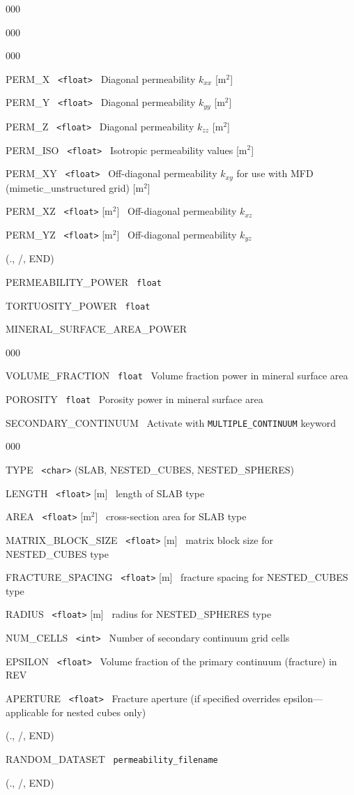 \documentclass[12pt]{article}
\begin{document}
\begin{deflist}{000}
\begin{deflist}{000}
\begin{deflist}{000}
\item[PERM\_X] \ {\tt <float>} \ Diagonal permeability $k_{xx}$ [m$^2$]
\item[PERM\_Y] \ {\tt <float>} \ Diagonal permeability $k_{yy}$ [m$^2$]
\item[PERM\_Z] \ {\tt <float>} \ Diagonal permeability $k_{zz}$ [m$^2$]
\item[PERM\_ISO] \ {\tt <float>} \ Isotropic permeability values [m$^2$]
\item[PERM\_XY] \ {\tt <float>} \ Off-diagonal permeability $k_{xy}$ for use with MFD (mimetic\_unstructured grid) [m$^2$]
\item[PERM\_XZ] \ {\tt <float>} [m$^2$] \ Off-diagonal permeability $k_{xz}$
\item[PERM\_YZ] \ {\tt <float>} [m$^2$] \ Off-diagonal permeability $k_{yz}$
\end{deflist}
\item[(., /, END)]
\item[PERMEABILITY\_POWER] \ {\tt float}
\item[TORTUOSITY\_POWER] \ {\tt float}
\item[MINERAL\_SURFACE\_AREA\_POWER] ~
\begin{deflist}{000}
\item[VOLUME\_FRACTION] \ {\tt float} \ Volume fraction power in mineral surface area
\item[POROSITY] \ {\tt float} \ Porosity power in mineral surface area
\end{deflist}
\item[SECONDARY\_CONTINUUM] \ Activate with {\tt MULTIPLE\_CONTINUUM} keyword 
\begin{deflist}{000}
\item[TYPE] \ {\tt <char>} (SLAB, NESTED\_CUBES, NESTED\_SPHERES)
\item[LENGTH] \ {\tt <float>} [m] \ length of SLAB type
\item[AREA] \ {\tt <float>} [m$^2$] \ cross-section area for SLAB type
\item[MATRIX\_BLOCK\_SIZE] \ {\tt <float>} [m] \ matrix block size for NESTED\_CUBES type
\item[FRACTURE\_SPACING] \ {\tt <float>} [m] \ fracture spacing for NESTED\_CUBES type
\item[RADIUS] \ {\tt <float>} [m] \ radius for NESTED\_SPHERES type
\item[NUM\_CELLS] \ {\tt <int>} \ Number of secondary continuum grid cells
\item[EPSILON] \ {\tt <float>} \ Volume fraction of the primary continuum (fracture) in REV
\item[APERTURE] \ {\tt <float>} \ Fracture aperture (if specified overrides epsilon---applicable for nested cubes only)
\end{deflist}
\item[(., /, END)]
\item[RANDOM\_DATASET] \ {\tt permeability\_filename}
\end{deflist}
\item[(., /, END)]
\end{deflist}
\end{document}
